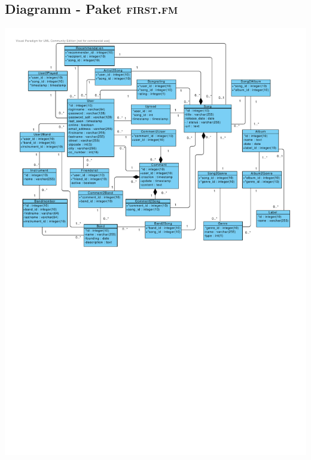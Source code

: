 \documentclass[11pt,a4paper,DIV=9]{scrartcl}
\begin{document}
\subsection{Diagramm - Paket \textsc{first.fm}}
     \includegraphics[angle=90,trim=1cm 0cm 1.1cm 1cm, clip=true, scale=0.99]{Diagramme/Paket_FirstFm}
\end{document}
